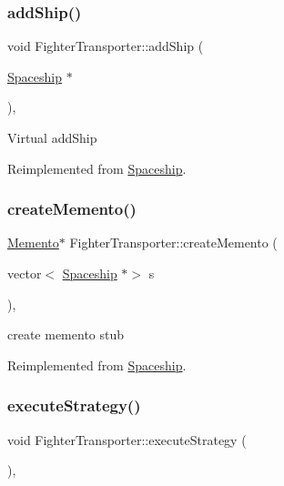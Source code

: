 \subsubsection{\texorpdfstring{add\+Ship()}{addShip()}}
{\footnotesize\ttfamily void Fighter\+Transporter\+::add\+Ship (\begin{DoxyParamCaption}\item[{\hyperlink{classSpaceship}{Spaceship} $\ast$}]{ }\end{DoxyParamCaption})\hspace{0.3cm}{\ttfamily [inline]}, {\ttfamily [virtual]}}

Virtual add\+Ship 

Reimplemented from \hyperlink{classSpaceship_a90e1321cdbcb459b98b75ab39cef867d}{Spaceship}.

\mbox{\label{classFighterTransporter_ac20f71500dbddc40b9c6fcfd0dfd3b46}} 
\subsubsection{\texorpdfstring{create\+Memento()}{createMemento()}}
{\footnotesize\ttfamily \hyperlink{classMemento}{Memento}$\ast$ Fighter\+Transporter\+::create\+Memento (\begin{DoxyParamCaption}\item[{vector$<$ \hyperlink{classSpaceship}{Spaceship} $\ast$$>$}]{s }\end{DoxyParamCaption})\hspace{0.3cm}{\ttfamily [inline]}, {\ttfamily [virtual]}}

create memento stub 

Reimplemented from \hyperlink{classSpaceship_a6d272f846b019dec8226ddab65648a7b}{Spaceship}.

\mbox{\label{classFighterTransporter_a0b0187f9eae58f2b24be8f7c9fc2a180}} 
\subsubsection{\texorpdfstring{execute\+Strategy()}{executeStrategy()}}
{\footnotesize\ttfamily void Fighter\+Transporter\+::execute\+Strategy (\begin{DoxyParamCaption}{ }\end{DoxyParamCaption})\hspace{0.3cm}{\ttfamily [inline]}, {\ttfamily [virtual]}}

